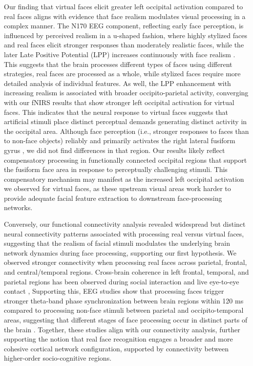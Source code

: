 Our finding that virtual faces elicit greater left occipital activation compared to real faces aligns with evidence that face realism modulates visual processing in a complex manner. 
The N170 EEG component, reflecting early face perception, is influenced by perceived realism in a u-shaped fashion, where highly stylized faces and real faces elicit stronger responses than moderately realistic faces, while the later Late Positive Potential (LPP) increases continuously with face realism \citep{schindler_differential_2017}. 
This suggests that the brain processes different types of faces using different strategies, real faces are processed as a whole, while stylized faces require more detailed analysis of individual features.
As well, the LPP enhancement with increasing realism is associated with broader occipito-parietal activity, converging with our fNIRS results that show stronger left occipital activation for virtual faces.
This indicates that the neural response to virtual faces suggests that artificial stimuli place distinct perceptual demands generating distinct activity in the occipital area. 
Although face perception (i.e., stronger responses to faces than to non-face objects) reliably and primarily activates the right lateral fusiform gyrus \citep{haxby_distributed_2000}, we did not find differences in that region. 
Our results likely reflect compensatory processing in functionally connected occipital regions that support the fusiform face area in response to perceptually challenging stimuli. 
This compensatory mechanism may manifest as the increased left occipital activation we observed for virtual faces, as these upstream visual areas work harder to provide adequate facial feature extraction to downstream face-processing networks.

Conversely, our functional connectivity analysis revealed widespread but distinct neural connectivity patterns associated with processing real versus virtual faces, suggesting that the realism of facial stimuli modulates the underlying brain network dynamics during face processing, supporting our first hypothesis.
We observed stronger connectivity when processing real faces across parietal, frontal, and central/temporal regions. 
Cross-brain coherence in left frontal, temporal, and parietal regions has been observed during social interaction and live eye-to-eye contact \citep{hirsch_frontal_2017}, 
Supporting this, EEG studies show that processing faces trigger stronger theta-band phase synchronization between brain regions within 120 ms compared to processing non-face stimuli between parietal and occipito-temporal areas, suggesting that different stages of face processing occur in distinct parts of the brain \citep{yang_dynamic_2015}. 
Together, these studies align with our connectivity analysis, further supporting the notion that real face recognition engages a broader and more cohesive cortical network configuration, supported by connectivity between higher-order socio-cognitive regions. 

